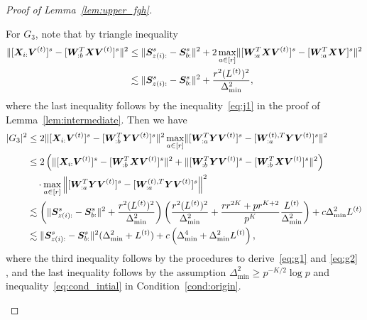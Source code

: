 \documentclass[lettersize,onecolumn,journal]{IEEEtran}
\theoremstyle{definition}
\theoremstyle{definition}
\newcommand{\of}[1]{\left(#1\right)}
\begin{document}
\begin{proof}[Proof of Lemma~\ref{lem:upper_fgh}]
\begin{enumerate}
    For $G_3$, note that by triangle inequality
    \begin{align}
        \onormSize{}{[\mX_{i:} \mV^{(t)}]^s  -  [  \mW_{:b}^T \mX \mV^{(t)} ]^s}^2 &\leq \onormSize{}{\mS_{z(i):}^s - \mS_{b:}^s}^2 + 2\max_{a \in [r]}\onormSize{}{[\mW_{:a}^T\mX \mV^{(t)}]^s - [\mW_{:a}^T\mX \mV]^s }^2\\
        & \lesssim \onormSize{}{\mS_{z(i):}^s - \mS_{b:}^s}^2 + \frac{r^2 (L^{(t)})^2}{\Delta_{\min}^2}, \label{eq:g3xv_wxv}
    \end{align}
    where the last inequality follows by the inequality~\eqref{eq:j1} in the proof of Lemma~\ref{lem:intermediate}.
   Then we have 
    \begin{align}
        |G_3|^2 & \leq 2 \onormSize{}{[\mX_{i:} \mV^{(t)}]^s  -  [  \mW_{:b}^T \mY \mV^{(t)} ]^s}^2 \max_{a \in [r]} \onormSize{}{ [  \mW_{:a}^T \mY \mV^{(t)} ]^s -  [   \mW_{:a}^{(t),T} \mY \mV^{(t)}  ]^s}^2 \\
        & \leq 2 \of{ \onormSize{}{[\mX_{i:} \mV^{(t)}]^s  -  [  \mW_{:b}^T \mX \mV^{(t)} ]^s}^2  +  \onormSize{}{ [  \mW_{:b}^T \mY \mV^{(t)} ]^s  -  [  \mW_{:b}^T \mX \mV^{(t)} ]^s}^2  } \\
        & \quad \cdot \max_{a \in [r]} \onorm{ [  \mW_{:a}^T \mY \mV^{(t)} ]^s -  [   \mW_{:a}^{(t),T} \mY \mV^{(t)}  ]^s}^2\\
        & \lesssim \of{\onormSize{}{\mS_{z(i):}^s - \mS_{b:}^s}^2 + \frac{r^2 (L^{(t)})^2}{\Delta_{\min}^2} } \of{ \frac{r^2(L^{(t)})^2}{ \Delta_{\min}^2} + \frac{r r^{2K} + pr^{K+2}}{p^{K}} \frac{L^{(t)}}{\Delta_{\min}^2}}+ c \Delta_{\min}^2 L^{(t)} \\
        & \lesssim \onormSize{}{\mS_{z(i):}^s - \mS_{b:}^s}^2 (\Delta_{\min}^2 + L^{(t)}) + c\of{\Delta_{\min}^4 +  \Delta_{\min}^2 L^{(t)}},\label{eq:g3}
    \end{align}
    where the third inequality follows by the procedures to derive~\eqref{eq:g1} and \eqref{eq:g2}
    , and the last inequality follows by the assumption $\Delta_{\min}^2 \geq p^{-K/2} \log p$ and inequality~\eqref{eq:cond_intial} in Condition~\ref{cond:origin}.
    

\end{enumerate}
\end{proof}
\end{document}
